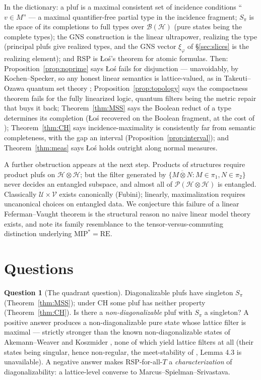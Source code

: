 \documentclass[11pt,reqno]{amsart}
\theoremstyle{definition}
\newtheorem{question}[theorem]{Question}
\newcommand{\HH}{\mathcal{H}}
\newcommand{\PP}{\mathcal{P}}
\newcommand{\BH}{\mathcal{B}(\HH)}
\newcommand{\pluf}{\pi}
\begin{document}
In the dictionary: a pluf is a maximal consistent set of incidence conditions
``$v\in M$'' --- a maximal quantifier-free partial type in the incidence fragment;
$S_\pluf$ is the space of its completions to full types over $\BH$ (pure states being
the complete types); the GNS construction is the linear ultrapower, realizing the type
(principal plufs give realized types, and the GNS vector $\xi_\varphi$ of
\S\ref{sec:slices} is the realizing element); and RSP is \L o\'s's theorem for atomic
formulas. Then:
Proposition~\ref{prop:noprime} says \L o\'s fails for disjunction --- unavoidably, by
Kochen--Specker, so any honest linear semantics is lattice-valued, as in
Takeuti--Ozawa quantum set theory \cite{Ozawa};
Proposition~\ref{prop:topology} says the compactness theorem fails for the fully
linearized logic, quantum filters being the metric repair that buys it back;
Theorem~\ref{thm:MSS} says the Boolean reduct of a type determines its completion
(\L o\'s recovered on the Boolean fragment, at the cost of \cite{MSS});
Theorem~\ref{thm:CH} says incidence-maximality is consistently far from semantic
completeness, with the gap an interval (Proposition~\ref{prop:interval}); and
Theorem~\ref{thm:meas} says \L o\'s holds outright along normal measures.

A further obstruction appears at the next step. Products of
structures require product plufs on $\HH\otimes\HH$; but the filter generated by
$\{\overline{M\otimes N}:M\in\pluf_1,N\in\pluf_2\}$ never decides an entangled subspace,
and almost all of $\PP(\HH\otimes\HH)$ is entangled. Classically $\mathcal U\times
\mathcal V$ exists canonically (Fubini); linearly, maximalization requires uncanonical
choices on entangled data. We conjecture this failure of a linear Feferman--Vaught
theorem is the structural reason no naive linear model theory exists, and note its family
resemblance to the tensor-versus-commuting distinction underlying $\mathrm{MIP}^*=
\mathrm{RE}$.

\section{Questions}\label{sec:questions}

\begin{question}[The quadrant question]\label{q:quadrant}
Diagonalizable plufs have singleton $S_\pluf$ (Theorem~\ref{thm:MSS}); under CH some pluf
has neither property (Theorem~\ref{thm:CH}). Is there a \emph{non-diagonalizable} pluf
with $S_\pluf$ a singleton? A positive answer produces a non-diagonalizable pure state
whose lattice filter is maximal --- strictly stronger than the known non-diagonalizable
states of Akemann--Weaver \cite{AW} and Koszmider \cite{Koszmider}, none of which yield
lattice filters at all (their states being singular, hence non-regular, the meet-stability
of \cite{BlecherWeaver}, Lemma 4.3 is unavailable). A negative answer makes RSP-for-all-$T$
a \emph{characterization} of diagonalizability: a lattice-level converse to
Marcus--Spielman--Srivastava.
\end{question}
\end{document}
